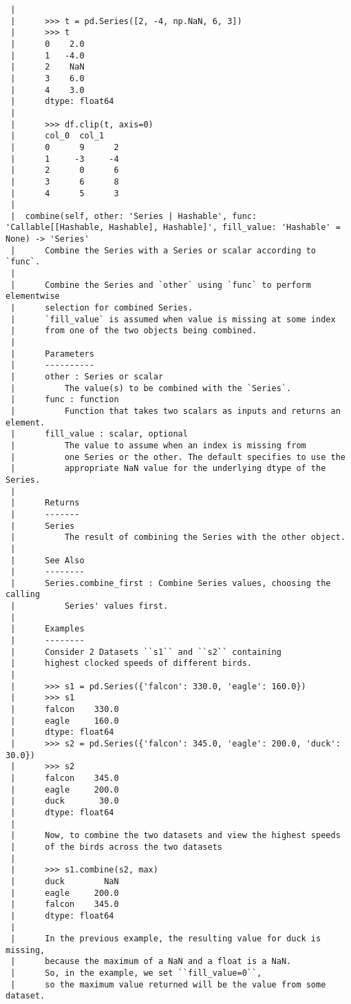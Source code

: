 \documentclass[
  letterpaper,
  DIV=11,
  numbers=noendperiod]{scrreprt}
\begin{document}
\begin{verbatim}
 |      
 |      >>> t = pd.Series([2, -4, np.NaN, 6, 3])
 |      >>> t
 |      0    2.0
 |      1   -4.0
 |      2    NaN
 |      3    6.0
 |      4    3.0
 |      dtype: float64
 |      
 |      >>> df.clip(t, axis=0)
 |      col_0  col_1
 |      0      9      2
 |      1     -3     -4
 |      2      0      6
 |      3      6      8
 |      4      5      3
 |  
 |  combine(self, other: 'Series | Hashable', func: 'Callable[[Hashable, Hashable], Hashable]', fill_value: 'Hashable' = None) -> 'Series'
 |      Combine the Series with a Series or scalar according to `func`.
 |      
 |      Combine the Series and `other` using `func` to perform elementwise
 |      selection for combined Series.
 |      `fill_value` is assumed when value is missing at some index
 |      from one of the two objects being combined.
 |      
 |      Parameters
 |      ----------
 |      other : Series or scalar
 |          The value(s) to be combined with the `Series`.
 |      func : function
 |          Function that takes two scalars as inputs and returns an element.
 |      fill_value : scalar, optional
 |          The value to assume when an index is missing from
 |          one Series or the other. The default specifies to use the
 |          appropriate NaN value for the underlying dtype of the Series.
 |      
 |      Returns
 |      -------
 |      Series
 |          The result of combining the Series with the other object.
 |      
 |      See Also
 |      --------
 |      Series.combine_first : Combine Series values, choosing the calling
 |          Series' values first.
 |      
 |      Examples
 |      --------
 |      Consider 2 Datasets ``s1`` and ``s2`` containing
 |      highest clocked speeds of different birds.
 |      
 |      >>> s1 = pd.Series({'falcon': 330.0, 'eagle': 160.0})
 |      >>> s1
 |      falcon    330.0
 |      eagle     160.0
 |      dtype: float64
 |      >>> s2 = pd.Series({'falcon': 345.0, 'eagle': 200.0, 'duck': 30.0})
 |      >>> s2
 |      falcon    345.0
 |      eagle     200.0
 |      duck       30.0
 |      dtype: float64
 |      
 |      Now, to combine the two datasets and view the highest speeds
 |      of the birds across the two datasets
 |      
 |      >>> s1.combine(s2, max)
 |      duck        NaN
 |      eagle     200.0
 |      falcon    345.0
 |      dtype: float64
 |      
 |      In the previous example, the resulting value for duck is missing,
 |      because the maximum of a NaN and a float is a NaN.
 |      So, in the example, we set ``fill_value=0``,
 |      so the maximum value returned will be the value from some dataset.

\end{verbatim}
\end{document}
